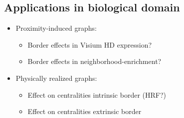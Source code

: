 \documentclass[fleqn,10pt]{olplainarticle}
\begin{document}

\subsection*{Applications in biological domain}
\begin{itemize}
    \item Proximity-induced graphs:
    \begin{itemize}
        \item Border effects in Visium HD expression?
        \item Border effects in neighborhood-enrichment?
    \end{itemize}
    \item Physically realized graphs:
    \begin{itemize}
    \item Effect on centralities intrinsic border (HRF?)
    \item Effect on centralities extrinsic border
    \end{itemize}
\end{itemize}
\end{document}
